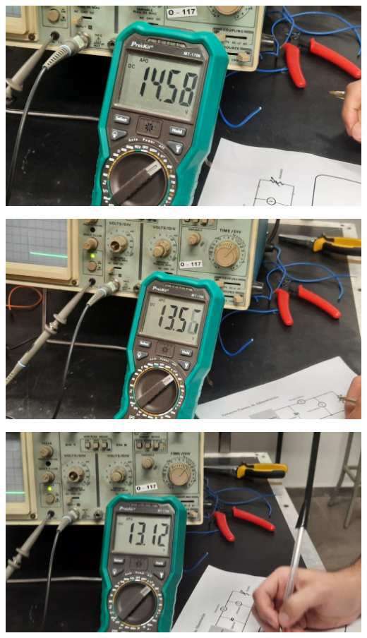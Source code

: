 \begin{center}
    \centering
    \includegraphics[width=0.9\linewidth]{./imagenes/tension_baja_075.jpg}
\end{center}

\begin{center}
    \centering
    \includegraphics[width=0.9\linewidth]{./imagenes/tension_baja_1,25.jpg}
\end{center}

\begin{center}
    \centering
    \includegraphics[width=0.9\linewidth]{./imagenes/tension_baja_1,50.jpg}
\end{center}


